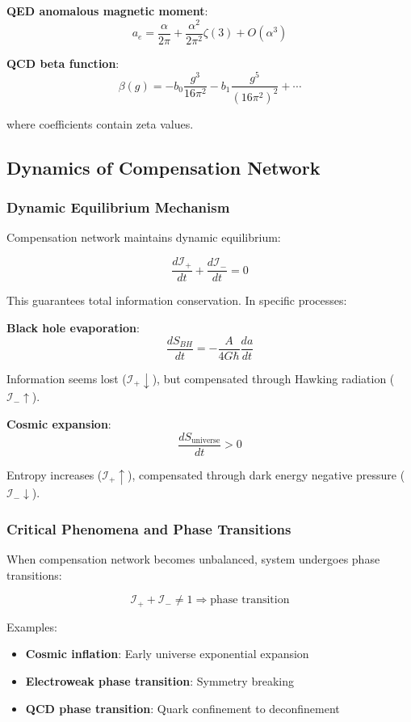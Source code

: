 \documentclass[12pt,a4paper]{article}
\begin{document}
\textbf{QED anomalous magnetic moment}:
$$a_e = \frac{\alpha}{2\pi} + \frac{\alpha^2}{2\pi^2} \zeta(3) + O(\alpha^3)$$

\textbf{QCD beta function}:
$$\beta(g) = -b_0 \frac{g^3}{16\pi^2} - b_1 \frac{g^5}{(16\pi^2)^2} + \cdots$$

where coefficients contain zeta values.

\subsection{Dynamics of Compensation Network}

\subsubsection{Dynamic Equilibrium Mechanism}

Compensation network maintains dynamic equilibrium:

$$\frac{d\mathcal{I}_+}{dt} + \frac{d\mathcal{I}_-}{dt} = 0$$

This guarantees total information conservation. In specific processes:

\textbf{Black hole evaporation}:
$$\frac{dS_{BH}}{dt} = -\frac{A}{4G\hbar} \frac{da}{dt}$$

Information seems lost ($\mathcal{I}_+ \downarrow$), but compensated through Hawking radiation ($\mathcal{I}_- \uparrow$).

\textbf{Cosmic expansion}:
$$\frac{dS_{\text{universe}}}{dt} > 0$$

Entropy increases ($\mathcal{I}_+ \uparrow$), compensated through dark energy negative pressure ($\mathcal{I}_- \downarrow$).

\subsubsection{Critical Phenomena and Phase Transitions}

When compensation network becomes unbalanced, system undergoes phase transitions:

$$\mathcal{I}_+ + \mathcal{I}_- \neq 1 \Rightarrow \text{phase transition}$$

Examples:
\begin{itemize}
\item \textbf{Cosmic inflation}: Early universe exponential expansion
\item \textbf{Electroweak phase transition}: Symmetry breaking
\item \textbf{QCD phase transition}: Quark confinement to deconfinement
\end{itemize}
\end{document}
